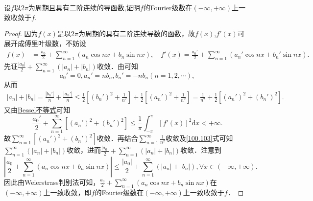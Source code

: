 \documentclass[../../main.tex]{subfiles}%
\begin{document}
\begin{example}
设$f$以$2\pi$为周期且具有二阶连续的导函数,证明$f$的Fourier级数在$(-\infty,+\infty)$上一致收敛于$f$.
\end{example}
\begin{proof}
因为$f(x)$是以$2\pi$为周期的具有二阶连续导数的函数，故$f(x)$,$f'(x)$可展开成傅里叶级数，不妨设
\begin{align*}
f(x) &=\frac{a_0}{2}+\sum_{n=1}^{\infty}(a_n\cos nx+b_n\sin nx),\quad f'(x)=\frac{a_{0}'}{2}+\sum_{n=1}^{\infty}(a_{n}'\cos nx+b_{n}'\sin nx).
\end{align*}
先证$\frac{|a_0|}{2}+\sum_{n=1}^{\infty}(|a_n|+|b_n|)$收敛．由可知
$$a_{0}'=0,a_{n}'=nb_n,b_{n}'=-nb_n(n=1,2,\cdots),$$
从而
\begin{align}
|a_n|+|b_n|=\frac{|b_{n}'|}{n}+\frac{|a_{n}'|}{n}\leqslant \frac{1}{2}\left[(b_{n}')^2+\frac{1}{n^2}\right]+\frac{1}{2}\left[(a_{n}')^2+\frac{1}{n^2}\right]
=\frac{1}{n^2}+\frac{1}{2}\left[(a_{n}')^2+(b_{n}')^2\right].\label{100.103}
\end{align}
又由\hyperref[theorem:Bessel不等式]{Bessel不等式}可知
$$\frac{a_{0}'}{2}+\sum_{n=1}^{\infty}\left[(a_{n}')^2+(b_{n}')^2\right]\leqslant \frac{1}{\pi}\int_{-\pi}^{\pi}[f'(x)]^2\mathrm{d}x<+\infty.$$
故$\sum_{n=1}^{\infty}\left[(a_{n}')^2+(b_{n}')^2\right]$收敛．再结合$\sum_{n=1}^{\infty}\frac{1}{n^2}$收敛及\eqref{100.103}式可知$\sum_{n=1}^{\infty}(|a_n|+|b_n|)$收敛，进而$\frac{|a_0|}{2}+\sum_{n=1}^{\infty}(|a_n|+|b_n|)$收敛．注意到
$$\left|\frac{a_0}{2}+\sum_{n=1}^{\infty}(a_n\cos nx+b_n\sin nx)\right|\leqslant \frac{|a_0|}{2}+\sum_{n=1}^{\infty}(|a_n|+|b_n|),\forall x\in(-\infty,+\infty).$$
因此由Weierstrass判别法可知，$\frac{a_0}{2}+\sum_{n=1}^{\infty}(a_n\cos nx+b_n\sin nx)$在$(-\infty,+\infty)$上一致收敛，即$f$的Fourier级数在$(-\infty,+\infty)$上一致收敛于$f$．
\end{proof}
\end{document}
